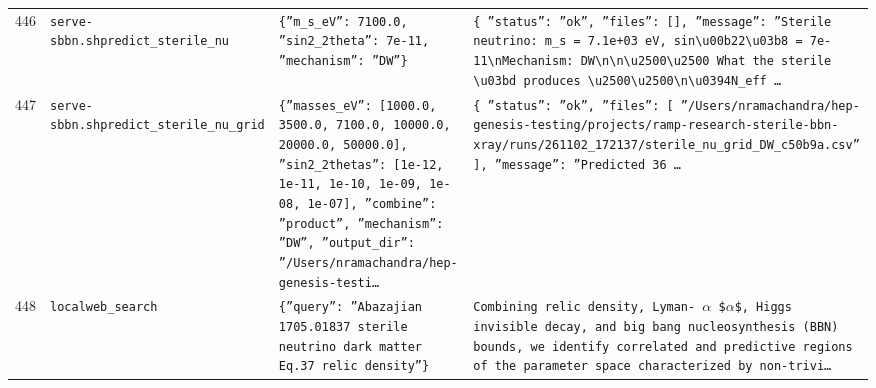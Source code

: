 \documentclass[11pt,a4paper]{article}
\begin{document}
\begin{longtable}{@{}p{}p{}p{}p{}@{}}
446 & \texttt{serve-sbbn.sh}\newline\texttt{predict\_\allowbreak{}sterile\_\allowbreak{}nu} & \texttt{\{''m\_\allowbreak{}s\_\allowbreak{}eV'':\allowbreak{} 7100.0,\allowbreak{} ''sin2\_\allowbreak{}2theta'':\allowbreak{} 7e-11,\allowbreak{} ''mechanism'':\allowbreak{} ''DW''\}\allowbreak{}} & \texttt{\{   ''status'':\allowbreak{} ''ok'',\allowbreak{}   ''files'':\allowbreak{} []\allowbreak{},\allowbreak{}   ''message'':\allowbreak{} ''Sterile neutrino:\allowbreak{} m\_\allowbreak{}s =\allowbreak{} 7.1e+03 eV,\allowbreak{} sin\textbackslash{}\allowbreak{}u00b22\textbackslash{}\allowbreak{}u03b8 =\allowbreak{} 7e-11\textbackslash{}\allowbreak{}nMechanism:\allowbreak{} DW\textbackslash{}\allowbreak{}n\textbackslash{}\allowbreak{}n\textbackslash{}\allowbreak{}u2500\textbackslash{}\allowbreak{}u2500 What the sterile \textbackslash{}\allowbreak{}u03bd produces \textbackslash{}\allowbreak{}u2500\textbackslash{}\allowbreak{}u2500\textbackslash{}\allowbreak{}n\textbackslash{}\allowbreak{}u0394N\_\allowbreak{}eff \ldots{}\allowbreak{}} \\
447 & \texttt{serve-sbbn.sh}\newline\texttt{predict\_\allowbreak{}sterile\_\allowbreak{}nu\_\allowbreak{}grid} & \texttt{\{''masses\_\allowbreak{}eV'':\allowbreak{} [1000.0,\allowbreak{} 3500.0,\allowbreak{} 7100.0,\allowbreak{} 10000.0,\allowbreak{} 20000.0,\allowbreak{} 50000.0]\allowbreak{},\allowbreak{} ''sin2\_\allowbreak{}2thetas'':\allowbreak{} [1e-12,\allowbreak{} 1e-11,\allowbreak{} 1e-10,\allowbreak{} 1e-09,\allowbreak{} 1e-08,\allowbreak{} 1e-07]\allowbreak{},\allowbreak{} ''combine'':\allowbreak{} ''product'',\allowbreak{} ''mechanism'':\allowbreak{} ''DW'',\allowbreak{} ''output\_\allowbreak{}dir'':\allowbreak{} ''/\allowbreak{}Users/\allowbreak{}nramachandra/\allowbreak{}hep-genesis-testi\ldots{}\allowbreak{}} & \texttt{\{   ''status'':\allowbreak{} ''ok'',\allowbreak{}   ''files'':\allowbreak{} [     ''/\allowbreak{}Users/\allowbreak{}nramachandra/\allowbreak{}hep-genesis-testing/\allowbreak{}projects/\allowbreak{}ramp-research-sterile-bbn-xray/\allowbreak{}runs/\allowbreak{}261102\_\allowbreak{}172137/\allowbreak{}sterile\_\allowbreak{}nu\_\allowbreak{}grid\_\allowbreak{}DW\_\allowbreak{}c50b9a.csv''   ]\allowbreak{},\allowbreak{}   ''message'':\allowbreak{} ''Predicted 36 \ldots{}\allowbreak{}} \\
448 & \texttt{local}\newline\texttt{web\_\allowbreak{}search} & \texttt{\{''query'':\allowbreak{} ''Abazajian 1705.01837 sterile neutrino dark matter Eq.37 relic density''\}\allowbreak{}} & \texttt{Combining relic density,\allowbreak{} Lyman- $\alpha$ \$$\alpha$\$,\allowbreak{} Higgs invisible decay,\allowbreak{} and big bang nucleosynthesis (BBN)\allowbreak{} bounds,\allowbreak{} we identify correlated and predictive regions of the parameter space characterized by non-trivi\ldots{}\allowbreak{}} \\

\end{longtable}
\end{document}
